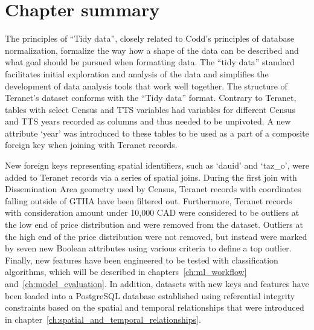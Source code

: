 \section{Chapter summary} \label{sec:data_preparation_summary}

The principles of ``Tidy data'', closely related to Codd's principles of database normalization, formalize the way how a shape of the data can be described and what goal should be pursued when formatting data.
The ``tidy data'' standard  facilitates initial exploration and analysis of the data and simplifies the development of data analysis tools that work well together.
The structure of Teranet's dataset conforms with the ``Tidy data'' format.
Contrary to Teranet, tables with select Census and TTS variables had variables for different Census and TTS years recorded as columns and thus needed to be unpivoted.
A new attribute `year' was introduced to these tables to be used as a part of a composite foreign key when joining with Teranet records.

New foreign keys representing spatial identifiers, such as `dauid' and `taz\_o', were added to Teranet records via a series of spatial joins.
During the first join with Dissemination Area geometry used by Census, Teranet records with coordinates falling outside of GTHA have been filtered out.
Furthermore, Teranet records with consideration amount under 10,000 CAD were considered to be outliers at the low end of price distribution and were removed from the dataset.
Outliers at the high end of the price distribution were not removed, but instead were marked by seven new Boolean attributes using various criteria to define a top outlier.
Finally, new features have been engineered to be tested with classification algorithms, which will be described in chapters~\ref{ch:ml_workflow} and~\ref{ch:model_evaluation}.
In addition, datasets with new keys and features have been loaded into a PostgreSQL database established using referential integrity constraints based on the spatial and temporal relationships that were introduced in chapter~\ref{ch:spatial_and_temporal_relationships}.
